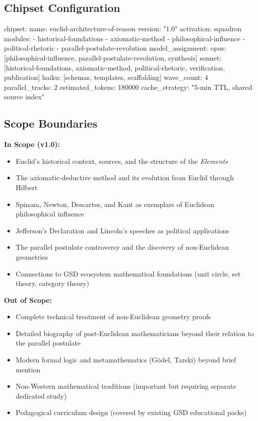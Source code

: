 \documentclass[11pt,letterpaper]{article}
\begin{document}
\subsection{Chipset Configuration}

\begin{asciibox}
chipset:
  name: euclid-architecture-of-reason
  version: "1.0"
  activation: squadron
  modules:
    - historical-foundations
    - axiomatic-method
    - philosophical-influence
    - political-rhetoric
    - parallel-postulate-revolution
  model_assignment:
    opus: [philosophical-influence, parallel-postulate-revolution, synthesis]
    sonnet: [historical-foundations, axiomatic-method, political-rhetoric,
             verification, publication]
    haiku: [schemas, templates, scaffolding]
  wave_count: 4
  parallel_tracks: 2
  estimated_tokens: 180000
  cache_strategy: "5-min TTL, shared source index"
\end{asciibox}

\subsection{Scope Boundaries}

\textbf{In Scope (v1.0):}
\begin{itemize}[leftmargin=2em]
  \item Euclid's historical context, sources, and the structure of the \textit{Elements}
  \item The axiomatic-deductive method and its evolution from Euclid through Hilbert
  \item Spinoza, Newton, Descartes, and Kant as exemplars of Euclidean philosophical influence
  \item Jefferson's Declaration and Lincoln's speeches as political applications
  \item The parallel postulate controversy and the discovery of non-Euclidean geometries
  \item Connections to GSD ecosystem mathematical foundations (unit circle, set theory, category theory)
\end{itemize}

\textbf{Out of Scope:}
\begin{itemize}[leftmargin=2em]
  \item Complete technical treatment of non-Euclidean geometry proofs
  \item Detailed biography of post-Euclidean mathematicians beyond their relation to the parallel postulate
  \item Modern formal logic and metamathematics (G\"odel, Tarski) beyond brief mention
  \item Non-Western mathematical traditions (important but requiring separate dedicated study)
  \item Pedagogical curriculum design (covered by existing GSD educational packs)
\end{itemize}
\end{document}
